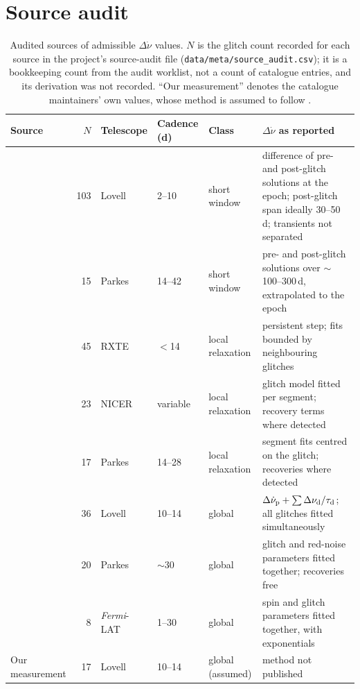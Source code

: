 \documentclass[fleqn,usenatbib]{mnras}
\begin{document}
\section{Source audit}\label{app:audit}
\begin{table}
\centering
\caption{Audited sources of admissible $\Delta\dot\nu$ values. $N$ is the
glitch count recorded for each source in the project's source-audit file
(\texttt{data/meta/source\_audit.csv}); it is a bookkeeping count from the
audit worklist, not a count of catalogue entries, and its derivation was not
recorded. ``Our
measurement'' denotes the catalogue maintainers' own values, whose method
is assumed to follow \citet{basu2022}.}
\label{tab:audit}
\small
\begin{tabular}{@{}lrlllp{6.2cm}@{}}
\toprule
Source & $N$ & Telescope & Cadence (d) & Class & $\Delta\dot\nu$ as reported\\
\midrule
\citet{espinoza2011} & 103 & Lovell & 2--10 & short window & difference of pre- and post-glitch solutions at the epoch; post-glitch span ideally 30--50\,d; transients not separated\\
\citet{wang2000} & 15 & Parkes & 14--42 & short window & pre- and post-glitch solutions over $\sim$100--300\,d, extrapolated to the epoch\\
\citet{antonopoulou2018} & 45 & RXTE & $<$14 & local relaxation & persistent step; fits bounded by neighbouring glitches\\
\citet{ho2026} & 23 & NICER & variable & local relaxation & glitch model fitted per segment; recovery terms where detected\\
\citet{yu2013} & 17 & Parkes & 14--28 & local relaxation & segment fits centred on the glitch; recoveries where detected\\
\citet{basu2022} & 36 & Lovell & 10--14 & global & $\Delta\dot\nu_{\rm p}+\sum\Delta\nu_{\rm d}/\tau_{\rm d}$; all glitches fitted simultaneously\\
\citet{lower2021} & 20 & Parkes & $\sim$30 & global & glitch and red-noise parameters fitted together; recoveries free\\
\citet{gugercinoglu2022} & 8 & \textit{Fermi}-LAT & 1--30 & global & spin and glitch parameters fitted together, with exponentials\\
Our measurement & 17 & Lovell & 10--14 & global (assumed) & method not published\\
\bottomrule
\end{tabular}
\end{table}
\end{document}
